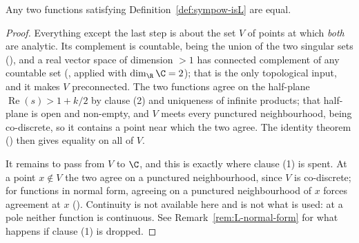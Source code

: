 \begin{theorem}
  \label{thm:sympow-L-unique}
  Any two functions satisfying Definition~\ref{def:sympow-isL} are equal.
\end{theorem}
\begin{proof}
  Everything except the last step is about the set $V$ of points at which \emph{both} are
  analytic. Its complement is countable, being the union of the two singular sets
  (), and a real vector space of
  dimension $>1$ has connected complement of any countable set
  (, applied with
  $\dim_{\R}\C = 2$); that is the only topological input, and it makes $V$ preconnected. The
  two functions agree on the half-plane $\operatorname{Re}(s)>1+k/2$ by clause (2) and
  uniqueness of infinite products; that half-plane is open and non-empty, and $V$ meets every
  punctured neighbourhood, being co-discrete, so it contains a point near which the two agree.
  The identity theorem
  () then gives equality on all of
  $V$.

  It remains to pass from $V$ to $\C$, and this is exactly where clause (1) is spent. At a
  point $x \notin V$ the two agree on a punctured neighbourhood, since $V$ is co-discrete;
  for functions in normal form, agreeing on a punctured neighbourhood of $x$ forces agreement
  at $x$ (). Continuity is
  not available here and is not what is used: at a pole neither function is continuous. See
  Remark~\ref{rem:L-normal-form} for what happens if clause (1) is dropped.
\end{proof}

